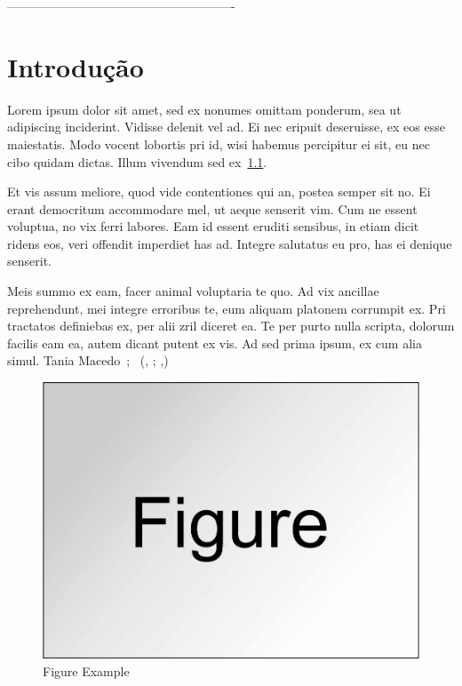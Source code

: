 
-------------------------------------------------------
\chapter{Introdução}
\label{Ch:Introducao}
Lorem ipsum dolor sit amet, sed ex nonumes omittam ponderum, sea ut adipiscing inciderint. Vidisse delenit vel ad. Ei nec eripuit deseruisse, ex eos esse maiestatis. Modo vocent lobortis pri id, wisi habemus percipitur ei sit, eu nec cibo quidam dictas. Illum vivendum sed ex~\ref{Fig:FigExample}.

Et vis assum meliore, quod vide contentiones qui an, postea semper sit no. Ei erant democritum accommodare mel, ut aeque senserit vim. Cum ne essent voluptua, no vix ferri labores. Eam id essent eruditi sensibus, in etiam dicit ridens eos, veri offendit imperdiet has ad. Integre salutatus eu pro, has ei denique senserit.

Meis summo ex eam, facer animal voluptaria te quo. Ad vix ancillae reprehendunt, mei integre erroribus te, eum aliquam platonem corrumpit ex. Pri tractatos definiebas ex, per alii zril diceret ea. Te per purto nulla scripta, dolorum facilis eam ea, autem dicant putent ex vis. Ad sed prima ipsum, ex cum alia simul.
Tania Macedo~\citep{Rules};~\citep{7886612}
(\citeauthor{Rules}, \citeyear{Rules}; \citeauthor{7886612},\citeyear{7886612})



\begin{figure}
\centering
\includegraphics[width=0.7\linewidth]{Cap1/Figure.jpg} 
\caption{Figure Example}
\label{Fig:FigExample}
\end{figure}

